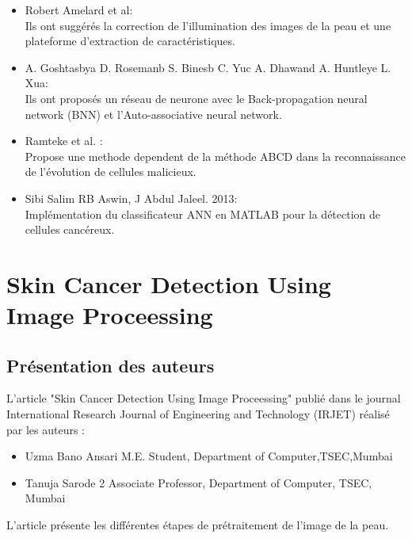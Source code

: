 \documentclass[12pt, letterpaper]{article}
\begin{document}
\begin{itemize}
		\item Robert Amelard et al:\\
		Ils ont suggérés la correction de l’illumination des images de la peau et une plateforme d’extraction de caractéristiques.
		\item A. Goshtasbya D. Rosemanb S. Binesb C. Yuc A. Dhawand A. Huntleye L. Xua:\\
		Ils ont proposés un réseau de neurone avec le Back-propagation neural network (BNN) et l’Auto-associative neural network.
		\item Ramteke et al. : \\
		Propose une methode dependent de la méthode ABCD dans la reconnaissance de l’évolution de cellules malicieux.
		\item Sibi Salim RB Aswin, J Abdul Jaleel. 2013: \\
		Implémentation du classificateur ANN en MATLAB pour la détection de cellules cancéreux.
\end{itemize}

\section{Skin Cancer Detection Using Image Proceessing}
\subsection{Présentation des auteurs}
\par L’article  "Skin Cancer Detection Using Image Proceessing"  publié dans le journal International Research Journal of Engineering and Technology (IRJET) réalisé par les auteurs :
\begin{itemize}
		\item Uzma Bano Ansari M.E. Student, Department of Computer,TSEC,Mumbai
		\item Tanuja Sarode 2 Associate Professor, Department of Computer, TSEC, Mumbai
\end{itemize}
L’article présente les différentes étapes de prétraitement de l’image de la peau.
\end{document}
